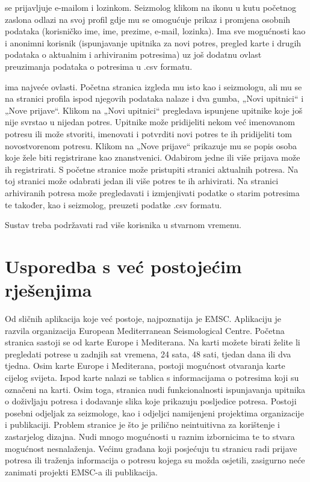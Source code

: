  se prijavljuje e-mailom i lozinkom. Seizmolog klikom na ikonu u kutu početnog zaslona odlazi na svoj profil gdje mu se omogućuje prikaz i promjena osobnih podataka (korisničko ime, ime, prezime, e-mail, lozinka). Ima sve mogućnosti kao i anonimni korisnik (ispunjavanje upitnika za novi potres, pregled karte i drugih podataka o aktualnim i arhiviranim potresima) uz još dodatnu ovlast preuzimanja podataka o potresima u .csv formatu.

 ima najveće ovlasti. Početna stranica izgleda mu isto kao i seizmologu, ali mu se na stranici profila ispod njegovih podataka nalaze i dva gumba, „Novi upitnici“ i „Nove prijave“. Klikom na „Novi upitnici“ pregledava ispunjene upitnike koje još nije svrstao u nijedan potres. Upitnike može pridijeliti nekom već imenovanom potresu ili može stvoriti, imenovati i potvrditi novi potres te ih pridijeliti tom novostvorenom potresu. Klikom na „Nove prijave“ prikazuje mu se popis osoba koje žele biti registrirane kao znanstvenici. Odabirom jedne ili više prijava može ih registrirati. S početne stranice može pristupiti stranici aktualnih potresa. Na toj stranici može odabrati jedan ili više potres te ih arhivirati. Na stranici arhiviranih potresa može pregledavati i izmjenjivati podatke o starim potresima te također, kao i seizmolog, preuzeti podatke .csv formatu.

Sustav treba podržavati rad više korisnika u stvarnom vremenu.\\



\section{Usporedba s već postojećim rješenjima}

{Od sličnih aplikacija koje već postoje, najpoznatija je EMSC. Aplikaciju je razvila organizacija European Mediterranean Seismological Centre. 
Početna stranica sastoji se od karte Europe i Mediterana. Na karti možete birati želite li pregledati potrese u zadnjih sat  vremena, 24 sata, 48 sati, tjedan dana ili dva tjedna. Osim karte Europe i Mediterana, postoji mogućnost otvaranja karte cijelog svijeta. 
Ispod karte nalazi se tablica s informacijama o potresima koji su označeni na karti. Osim toga, stranica nudi funkcionalnosti ispunjavanja upitnika o doživljaju potresa i dodavanje slika koje prikazuju posljedice potresa. Postoji posebni odjeljak za seizmologe, kao i odjeljci namijenjeni projektima organizacije i publikaciji. Problem stranice je što je prilično neintuitivna za korištenje i zastarjelog dizajna. Nudi mnogo mogućnosti u raznim izbornicima te to stvara mogućnost nesnalaženja. Većinu građana koji posjećuju tu stranicu radi prijave potresa ili traženja informacija o potresu kojega su možda osjetili, zasigurno neće zanimati projekti EMSC-a ili publikacija.}

